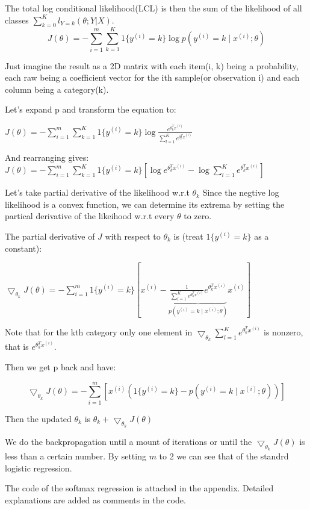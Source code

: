 \documentclass[a4paper]{article}
\begin{document}
The total log conditional likelihood(LCL) is then the sum of the likelihood of all classes $\sum_{k=0}^K l_{Y=k}(\theta; Y|X)$.
$$ J( \theta ) = - \sum^m_{i=1} \sum^K_{k=1} 1 \{ y^{(i)} = k \} \log p(y^{(i)} =  k \mid x^{(i)} ; \theta) $$

Just imagine the result as a 2D matrix with each item(i, k) being a probability, each raw being a coefficient vector for the ith sample(or observation i) and each column being a category(k).    

Let's expand p and transform the equation to:    

$ J( \theta ) = - \sum^m_{i=1} \sum^K_{k=1} 1 \{y^{(i)}=k\} \log \frac{e^{\theta^T_k x^{(i)}}}{\sum^K_{l=1}e^{\theta^T_l x^{(i)}}}$  

And rearranging gives:    
$ J( \theta )  =- \sum^m_{i=1} \sum^K_{k=1} 1 \{y^{(i)}=k\}[\log e^{\theta^T_kx^{(i)}}-\log \sum^K_{l=1}e^{\theta^T_kx^{(i)}}]$

Let's take partial derivative of the likelihood w.r.t $\theta_k$    
Since the negtive log likelihood is a convex function, we can determine its extrema by setting the partical derivative of the likeihood w.r.t every $\theta$ to zero. 

The partial derivative of $J$ with respect to $\theta_k$ is (treat $1 \{y^{(i)}=k\}$ as a constant):   

$ \bigtriangledown_{ \theta_k }J( \theta ) = - \sum^m_{i=1} 1 \{y^{(i)}=k\}[x^{(i)}-\underbrace{\frac{1}{\sum^K_{l=1}e^{\theta^T_kx^{(i)}}}e^{\theta^T_kx^{(i)}}}_{p(y^{(i)} =  k \mid x^{(i)} ; \theta)}x^{(i)}]$

Note that for the kth category only one element in $\bigtriangledown_{ \theta_k} \sum^K_{l=1}e^{\theta^T_kx^{(i)}}$ is nonzero, that is $e^{\theta^T_kx^{(i)}}$.    

Then we get p back and have: 

$$ \bigtriangledown_{ \theta_k }J( \theta ) = -\sum^{m}_{i=1} [x^{(i)} (1 \{ y^{(i)} = k \} - p(y^{(i)} =  k \mid x^{(i)} ; \theta) ) ] $$

Then the updated $\theta_k$ is $\theta_k+\bigtriangledown_{ \theta_k }J( \theta )$

We do the backpropagation until a mount of iterations or until the $\bigtriangledown_{ \theta_k }J( \theta )$ is less than a certain number. By setting $m$ to 2 we can see that of the standrd logistic regression.

The code of the softmax regression is attached in the appendix. Detailed explanations are added as comments in the code.
\end{document}
